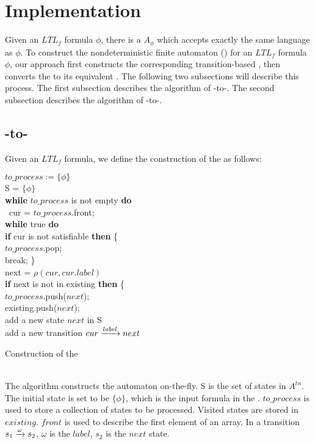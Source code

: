 \section{Implementation}\label{sec:algorithm}
Given an $LTL_f$ formula $\phi$, there is a \NFA $A_{\phi}$ which accepts exactly the same language as $\phi$. To construct the nondeterministic finite automaton (\NFA) for an $ LTL_f$ formula $\phi$, our approach first constructs the corresponding transition-based \NFA, then converts the \TNFA to its equivalent \NFA. The following two subsections will describe this process. The first subsection describes the algorithm of \ltlf-to-\TNFA. The second subsection describes the algorithm of \TNFA-to-\NFA.

\subsection{\ltlf-to-\TNFA}
Given an  $ LTL_f$ formula, we define the construction of the \TNFA  as follows: \\
  \begin{algorithm}[H]
    \SetAlgoNoLine
    \BlankLine
 $to\_process:= \{\phi\}$\\
 S = $\{\phi\}$ \\
\textbf{while} $to\_process$ is not empty \textbf{do} \\
\ cur =  $to\_process$.front;  \\
\quad  \textbf{while} true \textbf{do} \\
\qquad   \textbf{if} cur is not satisfiable  \textbf{then} \{ \\
\qquad \quad $to\_process$.pop; \\
\qquad \quad break;     \}\\
 \qquad  next = $\rho(cur, cur.label)$ \\
\qquad\textbf{if} next is not in existing \textbf{then} \{ \\
\qquad \quad $to\_process$.push($next$); \\
\qquad \quad existing.push($next$); \\
\qquad  \quad add a new state $next$ in S\\
\qquad  add a new transition $cur\xrightarrow[]{label}next$
 \caption{Construction of the \TNFA}
\end{algorithm}
~\\
The algorithm constructs the automaton on-the-fly. S is the set of states in \TNFA $A^{tn}$. The initial state is set to be $\{\phi\}$, which is the input formula in the \XNF. $to\_process$ is used to store a collection of states to be processed. Visited states are stored in $existing$. $front$ is used to describe the first element of an array. In a transition $s_1\xrightarrow[]{\omega}s_2$, $\omega$ is the $label$, $s_2$ is the $next$ state. 


